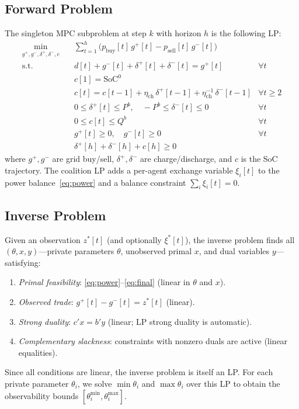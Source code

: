 \documentclass[11pt,a4paper]{article}
\newcommand{\pb}{p_{\text{buy}}}
\newcommand{\ps}{p_{\text{sell}}}
\newcommand{\netload}{d}
\newcommand{\Qb}{{Q^b}}
\newcommand{\Pb}{{P^b}}
\newcommand{\SoC}{{\text{SoC}^0}}
\newcommand{\ce}{\xi}
\begin{document}
\subsection{Forward Problem}

The singleton MPC subproblem at step $k$ with horizon $h$ is the following LP:
\begin{subequations}\label{eq:forward}
\begin{align}
    \min_{g^+, g^-, \delta^+, \delta^-, c} \quad & \sum_{t=1}^{h} \bigl(\pb[t]\, g^+[t] - \ps[t]\, g^-[t]\bigr) \label{eq:obj}\\
    \text{s.t.} \quad & \netload[t] + g^-[t] + \delta^+[t] + \delta^-[t] = g^+[t] & \forall t \label{eq:power}\\
    & c[1] = \SoC \label{eq:init}\\
    & c[t] = c[t-1] + \eta_{\text{ch}}\,\delta^+[t-1] + \eta_{\text{ch}}^{-1}\,\delta^-[t-1] & \forall t \geq 2 \label{eq:dyn}\\
    & 0 \leq \delta^+[t] \leq \Pb, \quad -\Pb \leq \delta^-[t] \leq 0 & \forall t \label{eq:rate}\\
    & 0 \leq c[t] \leq \Qb & \forall t \label{eq:cap}\\
    & g^+[t] \geq 0, \quad g^-[t] \geq 0 & \forall t \\
    & \delta^+[h] + \delta^-[h] + c[h] \geq 0 \label{eq:final}
\end{align}
\end{subequations}
where $g^+, g^-$ are grid buy/sell, $\delta^+, \delta^-$ are charge/discharge, and $c$ is the SoC trajectory. The coalition LP adds a per-agent exchange variable $\ce_i[t]$ to the power balance~\eqref{eq:power} and a balance constraint $\sum_i \ce_i[t] = 0$.

\subsection{Inverse Problem}

Given an observation $z^*[t]$ (and optionally $\ce^*[t]$), the inverse problem finds all $(\theta, x, y)$---private parameters $\theta$, unobserved primal $x$, and dual variables $y$---satisfying:
\begin{enumerate}[nosep,label=(\roman*)]
    \item \emph{Primal feasibility}: \cref{eq:power}--\eqref{eq:final} (linear in $\theta$ and $x$).
    \item \emph{Observed trade}: $g^+[t] - g^-[t] = z^*[t]$ (linear).
    \item \emph{Strong duality}: $c'x = b'y$ (linear; LP strong duality is automatic).
    \item \emph{Complementary slackness}: constraints with nonzero duals are active (linear equalities).
\end{enumerate}
Since all conditions are linear, the inverse problem is itself an LP. For each private parameter $\theta_i$, we solve $\min \theta_i$ and $\max \theta_i$ over this LP to obtain the observability bounds $[\theta_i^{\min}, \theta_i^{\max}]$.
\end{document}
